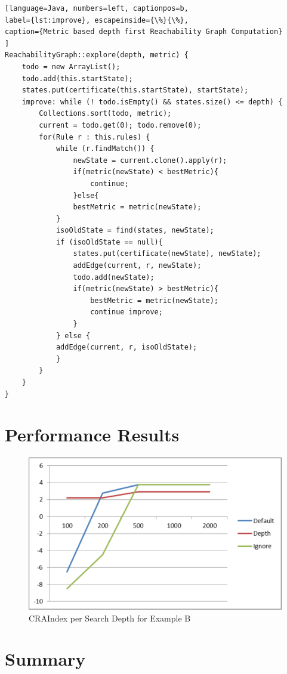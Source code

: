 \documentclass[submission,copyright,creativecommons]{eptcs}
\begin{document}
\begin{lstlisting}[language=Java, numbers=left, captionpos=b, 
label={lst:improve}, escapeinside={\%}{\%},
caption={Metric based depth first Reachability Graph Computation}
]
ReachabilityGraph::explore(depth, metric) {
	todo = new ArrayList();
	todo.add(this.startState);
	states.put(certificate(this.startState), startState);
	improve: while (! todo.isEmpty() && states.size() <= depth) {
		Collections.sort(todo, metric);
		current = todo.get(0); todo.remove(0);
		for(Rule r : this.rules) {
			while (r.findMatch()) {
				newState = current.clone().apply(r);
				if(metric(newState) < bestMetric){
					continue;
				}else{
				bestMetric = metric(newState);
			}
			isoOldState = find(states, newState);
			if (isoOldState == null){
				states.put(certificate(newState), newState);
				addEdge(current, r, newState);
				todo.add(newState);
				if(metric(newState) > bestMetric){
					bestMetric = metric(newState);
					continue improve;
				}
			} else {
			addEdge(current, r, isoOldState);
			}
		}
	}
}

\end{lstlisting}

\section{Performance Results}
\label{sec:results}

\begin{figure}[ht] \centering
	\includegraphics[width=\linewidth]{images/CRAByDepthB.pdf}
 \caption{CRAIndex per Search Depth for Example B}
 \label{fig:CRAByDepthB}
\end{figure}


\section{Summary}
\label{sec:summary}

 


  
\end{document}
